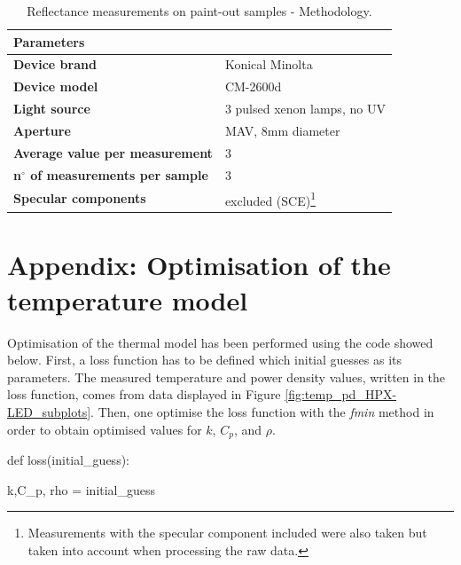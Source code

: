\begin{appendices}
\begin{table}[!h]
\centering 
\caption*{Reflectance measurements on paint-out samples - Methodology.}
\begin{tabular}{R{6cm}L{6cm}}
\toprule[0.4mm]
\textbf{Parameters} &  \\\midrule
\textbf{Device brand} & Konical Minolta \\
\textbf{Device model} & CM-2600d \\
\textbf{Light source} & 3 pulsed xenon lamps, no UV \\
\textbf{Aperture} & MAV, 8mm diameter \\
\textbf{Average value per measurement} & 3 \\
\textbf{n$^\circ$ of measurements per sample} & 3 \\
\textbf{Specular components} & excluded (SCE)\footnote{Measurements with the specular component included were also taken but taken into account when processing the raw data.} \\
\bottomrule[0.4mm]
\end{tabular}
\label{tab:lamps_AIS_methodology}
\end{table}






\newpage
\section[\hspace{0.3cm}Optimisation of the temperature model]{ Appendix: Optimisation of the temperature model}
\label{app:ch3_T-model_optimisation}

Optimisation of the thermal model has been performed using the code showed below. First, a loss function has to be defined which initial guesses as its parameters. The measured temperature and power density values, written in the loss function, comes from data displayed in Figure \ref{fig:temp_pd_HPX-LED_subplots}. Then, one optimise the loss function with the \textit{fmin} method in order to obtain optimised values for $k$, $C_p$, and $\rho$.\\

\vspace{1cm}

\small

def loss(initial\_guess):

	\hspace{0.5cm} k,C\_p, rho = initial\_guess  
	

\end{appendices}
